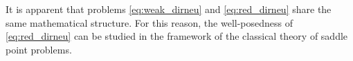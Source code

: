 \documentclass[r]{siamart171218}
\begin{document}
It is apparent that problems \eqref{eq:weak_dirneu} and \eqref{eq:red_dirneu} share the same mathematical structure.
For this reason, the well-posedness of \eqref{eq:red_dirneu} can be studied in the framework of the classical theory of saddle point problems.




\end{document}
